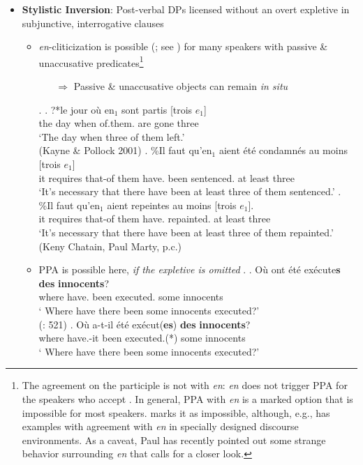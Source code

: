 \documentclass[letterpaper,10pt]{handout_nick}
\begin{document}
\begin{itemize}
\begin{multicols}{2}
\end{multicols}
\item {\bf Stylistic Inversion}: Post-verbal DPs licensed without an overt expletive in subjunctive, interrogative clauses
\begin{itemize}
\item \emph{en}-cliticization is possible (\citealt{kayne01}; see \Next) for many speakers with passive \& unaccusative predicates\footnote{The agreement on the participle is not with \emph{en}: \emph{en} does not trigger PPA for the speakers who accept \Last[b,c]. In general, PPA with \emph{en} is a marked option that is impossible for most speakers. \citet{belletti06} marks it as impossible, although, e.g., \citet{deprez98} has examples with agreement with \emph{en} in specially designed discourse environments. As a caveat, Paul has recently pointed out some strange behavior surrounding \emph{en} that calls for a closer look.}
\begin{itemize}
\item[$\Rightarrow$] Passive \& unaccusative objects can remain \emph{in situ}
\end{itemize} 
\ex. \ag. ?*le jour o\`u en$_1$ sont partis [trois $e_1$]\\
the day when of.them. are gone three\\
`The day when three of them left.'\\
(Kayne \& Pollock 2001)
\bg. \%Il faut qu'en$_1$ aient \'et\'e condamn\'es au moins [trois $e_1$]\\
it requires that-{of them} have. been sentenced. at least three\\
`It's necessary that there have been at least three of them sentenced.'
\bg. \%Il faut qu'en$_1$ aient repeintes au moins [trois $e_1$].\\
it requires that-{of them} have. repainted. at least three\\
`It's necessary that there have been at least three of them repainted.'\\
(Keny Chatain, Paul Marty, p.c.)
 
\item PPA is possible here, \emph{if the expletive is omitted}
\ex. \ag. O\`u ont \'et\'e ex\'ecute{\bf s} {\bf des} {\bf innocents}?\\
where have. been executed. some innocents\\
` Where have there been some innocents executed?'\\
(\citealt{cardinaletti97}: 521)
\bg. O\`u a-t-il \'et\'e ex\'ecut({\bf *es}) {\bf des} {\bf innocents}?\\
where have.-it been executed.(*) some innocents\\
` Where have there been some innocents executed?'


\end{itemize}
\end{itemize}
\end{document}
